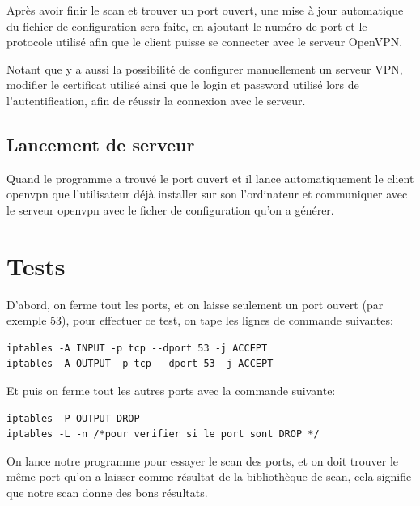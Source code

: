 \documentclass[12pt,a4paper]{article}
\begin{document}
Après avoir finir le scan et trouver un port ouvert, une mise à jour automatique du fichier de configuration sera faite, en ajoutant le numéro de port et le protocole utilisé afin que le client puisse se connecter avec le serveur OpenVPN.

Notant que y a aussi la possibilité de configurer manuellement un serveur VPN, modifier le certificat utilisé ainsi que le login et password utilisé lors de l'autentification, afin de réussir la connexion avec le serveur.
\subsection{Lancement de serveur}
Quand le programme a trouvé le port ouvert et il lance automatiquement le client openvpn que l'utilisateur déjà installer sur son l'ordinateur et communiquer avec le serveur openvpn avec le ficher de configuration qu'on a générer.
\newpage



\newpage
\section{Tests}

D'abord, on ferme tout les ports, et on laisse seulement un port ouvert (par exemple 53), pour effectuer ce test, on tape les lignes de commande suivantes:\\
\begin{lstlisting}[keywordstyle=\color{blue!70}, commentstyle=\color{red!50!green!50!blue!50}, frame=shadowbox, rulesepcolor=\color{red!20!green!20!blue!20}]
iptables -A INPUT -p tcp --dport 53 -j ACCEPT
iptables -A OUTPUT -p tcp --dport 53 -j ACCEPT
\end{lstlisting}
Et puis on ferme tout les autres ports avec la commande suivante:\\
\begin{lstlisting}[keywordstyle=\color{blue!70}, commentstyle=\color{red!50!green!50!blue!50}, frame=shadowbox,
rulesepcolor=\color{red!20!green!20!blue!20}]
iptables -P OUTPUT DROP
iptables -L -n /*pour verifier si le port sont DROP */
\end{lstlisting}

On lance notre programme pour essayer le scan des ports, et on doit trouver le même port qu'on a laisser comme résultat de la bibliothèque de scan, cela signifie que notre scan donne des bons résultats.\\
\end{document}
